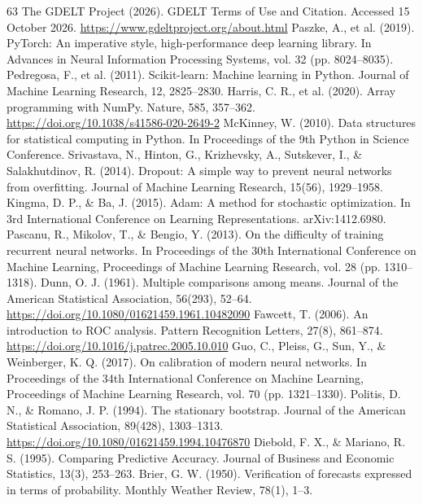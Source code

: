 \begin{thebibliography}{63}
     The GDELT Project (2026). GDELT Terms of Use and Citation. Accessed 15 October 2026. \url{https://www.gdeltproject.org/about.html}
     Paszke, A., et al. (2019). PyTorch: An imperative style, high-performance deep learning library. In Advances in Neural Information Processing Systems, vol. 32 (pp. 8024--8035).
     Pedregosa, F., et al. (2011). Scikit-learn: Machine learning in Python. Journal of Machine Learning Research, 12, 2825--2830.
     Harris, C. R., et al. (2020). Array programming with NumPy. Nature, 585, 357--362. \url{https://doi.org/10.1038/s41586-020-2649-2}
     McKinney, W. (2010). Data structures for statistical computing in Python. In Proceedings of the 9th Python in Science Conference.
     Srivastava, N., Hinton, G., Krizhevsky, A., Sutskever, I., \& Salakhutdinov, R. (2014). Dropout: A simple way to prevent neural networks from overfitting. Journal of Machine Learning Research, 15(56), 1929--1958.
     Kingma, D. P., \& Ba, J. (2015). Adam: A method for stochastic optimization. In 3rd International Conference on Learning Representations. arXiv:1412.6980.
     Pascanu, R., Mikolov, T., \& Bengio, Y. (2013). On the difficulty of training recurrent neural networks. In Proceedings of the 30th International Conference on Machine Learning, Proceedings of Machine Learning Research, vol. 28 (pp. 1310--1318).
     Dunn, O. J. (1961). Multiple comparisons among means. Journal of the American Statistical Association, 56(293), 52--64. \url{https://doi.org/10.1080/01621459.1961.10482090}
     Fawcett, T. (2006). An introduction to ROC analysis. Pattern Recognition Letters, 27(8), 861--874. \url{https://doi.org/10.1016/j.patrec.2005.10.010}
     Guo, C., Pleiss, G., Sun, Y., \& Weinberger, K. Q. (2017). On calibration of modern neural networks. In Proceedings of the 34th International Conference on Machine Learning, Proceedings of Machine Learning Research, vol. 70 (pp. 1321--1330).
     Politis, D. N., \& Romano, J. P. (1994). The stationary bootstrap. Journal of the American Statistical Association, 89(428), 1303--1313. \url{https://doi.org/10.1080/01621459.1994.10476870}
     Diebold, F. X., \& Mariano, R. S. (1995). Comparing Predictive Accuracy. Journal of Business and Economic Statistics, 13(3), 253--263.
     Brier, G. W. (1950). Verification of forecasts expressed in terms of probability. Monthly Weather Review, 78(1), 1--3.
\end{thebibliography}
